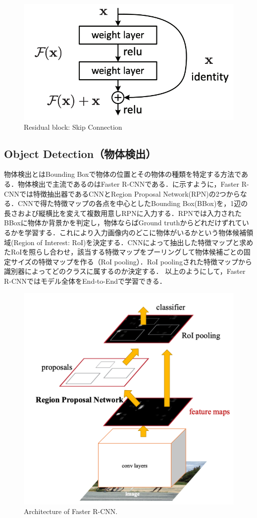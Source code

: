 \begin{figure}
    \centering
    \includegraphics[width=0.5\linewidth]{figure/chapter2/skipconnection}
    \caption{Residual block: Skip Connection}
    \label{fig:skipconnection}
\end{figure}



\subsection{Object Detection（物体検出）}
物体検出とはBounding Boxで物体の位置とその物体の種類を特定する方法である．物体検出で主流であるのはFaster R-CNNである\cite{fasterRCNN}．に示すように，Faster R-CNNでは特徴抽出器であるCNNとRegion Proposal Network(RPN)の2つからなる．CNNで得た特徴マップの各点を中心としたBounding Box(BBox)を，1辺の長さおよび縦横比を変えて複数用意しRPNに入力する．RPNでは入力されたBBoxに物体か背景かを判定し，物体ならばGround truthからどれだけずれているかを学習する．これにより入力画像内のどこに物体がいるかという物体候補領域(Region of Interest: RoI)を決定する．CNNによって抽出した特徴マップと求めたRoIを照らし合わせ，該当する特徴マップをプーリングして物体候補ごとの固定サイズの特徴マップを作る（RoI pooling）．RoI poolingされた特徴マップから識別器によってどのクラスに属するのか決定する．
以上のようにして，Faster R-CNNではモデル全体をEnd-to-Endで学習できる．

\begin{figure}[H]
    \centering
    \includegraphics[width=0.7\linewidth]{figure/chapter2/fasterr-cnn}
    \caption[Architecture of Faster R-CNN.]{Architecture of Faster R-CNN\cite{fasterRCNN}.}
    \label{fig:fasterRCNN}
\end{figure}


